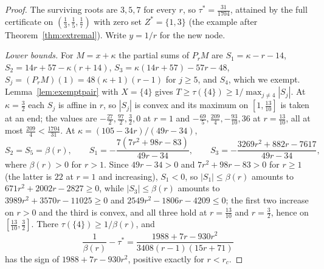 \documentclass[11pt]{article}
\theoremstyle{definition}
\theoremstyle{plain}
\begin{document}
\begin{proof}
The surviving roots are $3,5,7$ for every $r$, so $\tau^*=\tfrac{31}{1704}$,
attained by the full certificate on $(\tfrac13,\tfrac15,\tfrac17)$ with zero
set $Z^*=\{1,3\}$ (the example after Theorem~\ref{thm:extremal}).  Write
$y=1/r$ for the new node.

\emph{Lower bounds.}  For $M=x+\kappa$ the partial sums of $P_rM$ are
$S_1=\kappa-r-14$, $S_2=14r+57-\kappa(r+14)$, $S_3=\kappa(14r+57)-57r-48$,
$S_j=(P_rM)(1)=48(\kappa+1)(r-1)$ for $j\ge5$, and $S_4$, which we exempt.
Lemma~\ref{lem:exemptpair} with $X=\{4\}$ gives
$T\ge\tau(\{4\})\ge1/\max_{j\ne4}|S_j|$.  At $\kappa=\tfrac32$ each $S_j$ is
affine in $r$, so $|S_j|$ is convex and its maximum on $[1,\tfrac{13}{10}]$
is taken at an end; the values are $-\tfrac{27}2,\tfrac{97}2,\tfrac32,0$ at
$r=1$ and $-\tfrac{69}5,\tfrac{209}4,-\tfrac{93}{10},36$ at
$r=\tfrac{13}{10}$, all at most $\tfrac{209}4<\tfrac{1704}{31}$.  At
$\kappa=(105-34r)/(49r-34)$,
\[
  S_2=S_5=\beta(r),\qquad
  S_1=-\frac{7(7r^2+98r-83)}{49r-34},\qquad
  S_3=-\frac{3269r^2+882r-7617}{49r-34},
\]
where $\beta(r)>0$ for $r>1$.  Since $49r-34>0$ and $7r^2+98r-83>0$ for $r\ge1$ (the
latter is $22$ at $r=1$ and increasing), $S_1<0$, so $|S_1|\le\beta(r)$
amounts to $671r^2+2002r-2827\ge0$, while $|S_3|\le\beta(r)$ amounts to
$3989r^2+3570r-11025\ge0$ and $2549r^2-1806r-4209\le0$; the first two
increase on $r>0$ and the third is convex, and all three hold at
$r=\tfrac{13}{10}$ and $r=\tfrac32$, hence on $[\tfrac{13}{10},\tfrac32]$.
There $\tau(\{4\})\ge1/\beta(r)$, and
\[
  \frac1{\beta(r)}-\tau^*=\frac{1988+7r-930r^2}{3408(r-1)(15r+71)}
\]
has the sign of $1988+7r-930r^2$, positive exactly for $r<r_c$.


\end{proof}
\end{document}
